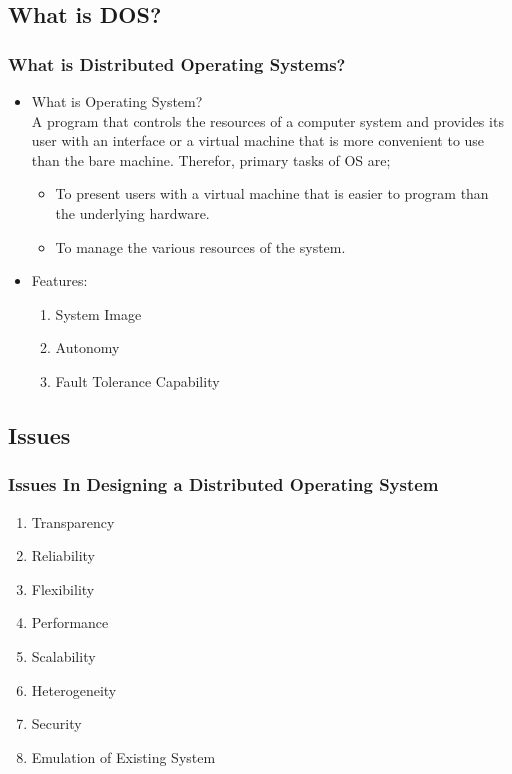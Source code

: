 \documentclass{beamer}
\begin{document}
\subsection{What is DOS?}
\begin{frame}
    \frametitle{ What is Distributed Operating Systems?}
    \begin{itemize}
      \item What is Operating System?
        \\A program that controls the resources of a computer system and provides its user with an interface or a virtual machine that is more convenient to use than the bare machine. Therefor, primary tasks of OS are;
        \begin{itemize}
          \item To present users with a virtual machine that is easier to program than the underlying hardware.
          \item To manage the various resources of the system.
        \end{itemize}
      \item Features:
      \begin{enumerate}
        \item System Image
        \item Autonomy
        \item Fault Tolerance Capability
      \end{enumerate}
    \end{itemize}
\end{frame}



\subsection{Issues}
\begin{frame}
    \frametitle{Issues In Designing a Distributed Operating System}
    \begin{enumerate}
      	\item Transparency
      	\item Reliability
      	\item Flexibility
      	\item Performance
      	\item Scalability
      	\item Heterogeneity
      	\item Security
      	\item Emulation of Existing System
    \end{enumerate}  
    \vspace{3cm} 
\end{frame}   
\end{document}
